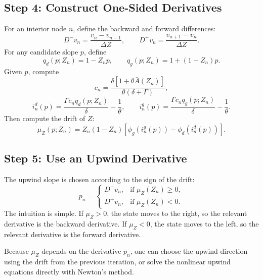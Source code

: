 \documentclass[11pt]{article}
\newcommand{\Abar}{\bar A}
\begin{document}
\subsection{Step 4: Construct One-Sided Derivatives}

For an interior node $n$, define the backward and forward differences:
\begin{equation}
    D^-v_n=\frac{v_n-v_{n-1}}{\Delta Z},
    \qquad
    D^+v_n=\frac{v_{n+1}-v_n}{\Delta Z}.
\end{equation}
For any candidate slope $p$, define
\begin{equation}
    q_d(p;Z_n)=1-Z_np,
    \qquad
    q_g(p;Z_n)=1+(1-Z_n)p.
\end{equation}
Given $p$, compute
\begin{equation}
    c_n=\frac{\delta\left[1+\theta\Abar(Z_n)\right]}{\theta(\delta+\Gamma)},
\end{equation}
\begin{equation}
    i^d_n(p)=\frac{\Gamma c_n q_d(p;Z_n)}{\delta}-\frac{1}{\theta},
    \qquad
    i^g_n(p)=\frac{\Gamma c_n q_g(p;Z_n)}{\delta}-\frac{1}{\theta}.
\end{equation}
Then compute the drift of $Z$:
\begin{equation}
    \mu_Z(p;Z_n)
    =
    Z_n(1-Z_n)
    \left[
    \phi_g(i^g_n(p))-\phi_d(i^d_n(p))
    \right].
\end{equation}

\subsection{Step 5: Use an Upwind Derivative}

The upwind slope is chosen according to the sign of the drift:
\begin{equation}
    p_n=
    \begin{cases}
    D^-v_n, & \text{if } \mu_Z(Z_n)\geq 0,\\
    D^+v_n, & \text{if } \mu_Z(Z_n)<0.
    \end{cases}
\end{equation}
The intuition is simple. If $\mu_Z>0$, the state moves to the right, so the relevant derivative is the backward derivative. If $\mu_Z<0$, the state moves to the left, so the relevant derivative is the forward derivative.

Because $\mu_Z$ depends on the derivative $p_n$, one can choose the upwind direction using the drift from the previous iteration, or solve the nonlinear upwind equations directly with Newton's method.
\end{document}
